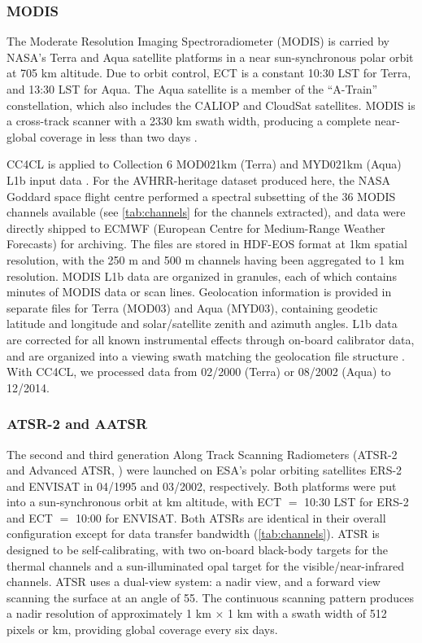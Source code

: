 \subsubsection{MODIS}

The Moderate Resolution Imaging Spectroradiometer (MODIS) is carried by NASA's Terra and Aqua satellite platforms in a near sun-synchronous polar orbit at 705 km altitude. Due to orbit control, ECT is a constant 10:30 LST for Terra, and 13:30 LST for Aqua. The Aqua satellite is a member of the ``A-Train'' constellation, which also includes the CALIOP and CloudSat satellites. MODIS is a cross-track scanner with a 2330 km swath width, producing a complete near-global coverage in less than two days \citep{Xiong09}.

CC4CL is applied to Collection 6 MOD021km (Terra) and MYD021km (Aqua) L1b input data \citep{MODIS_L1B}. For the AVHRR-heritage dataset produced here, the NASA Goddard space flight centre performed a spectral subsetting of the 36 MODIS channels available (see \autoref{tab:channels} for the channels extracted), and data were directly shipped to ECMWF (European Centre for Medium-Range Weather Forecasts) for archiving. The files are stored in HDF-EOS format at 1km spatial resolution, with the 250 m and 500 m channels having been aggregated to 1 km resolution. MODIS L1b data are organized in granules, each of which contains  minutes of MODIS data or  scan lines. Geolocation information is provided in separate files for Terra (MOD03) and Aqua (MYD03), containing geodetic latitude and longitude and solar/satellite zenith and azimuth angles. L1b data are corrected for all known instrumental effects through on-board calibrator data, and are organized into a viewing swath matching the geolocation file structure \citep{MODIS_PUG}. With CC4CL, we processed data from 02/2000 (Terra) or 08/2002 (Aqua) to 12/2014. 

\subsubsection{ATSR-2 and AATSR}

The second and third generation Along Track Scanning Radiometers (ATSR-2 and Advanced ATSR, \citet{Merchant12}) were launched on ESA's polar orbiting satellites ERS-2 and ENVISAT in 04/1995 and 03/2002, respectively. Both platforms were put into a sun-synchronous orbit at  km altitude, with ECT $=$ 10:30 LST for ERS-2 and ECT $=$ 10:00 for ENVISAT. Both ATSRs are identical in their overall configuration except for data transfer bandwidth (\autoref{tab:channels}). ATSR is designed to be self-calibrating, with two on-board black-body targets for the thermal channels and a sun-illuminated opal target for the visible/near-infrared channels. ATSR uses a dual-view system: a nadir view, and a forward view scanning the surface at an angle of 55\textdegree. The continuous scanning pattern produces a nadir resolution of approximately 1 km $\times$ 1 km with a swath width of 512 pixels or  km, providing global coverage every six days. 

